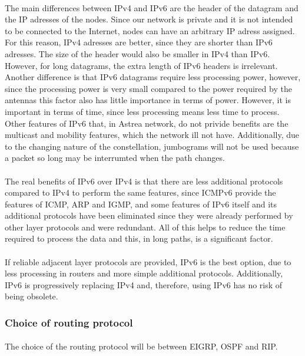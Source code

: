 \paragraph{}The main differences between IPv4 and IPv6 are the header of the datagram and the IP adresses of the nodes. Since our  network is private and it is not intended to be connected to the Internet, nodes can have an arbitrary IP adress assigned. For this reason, IPv4 adresses are better, since they are shorter than IPv6 adresses. The size of the header would also be smaller in IPv4 than IPv6. However, for long datagrams, the extra length of IPv6 headers is irrelevant. Another difference is that IPv6 datagrams require less processing power, however, since the processing power is very small compared to the power required by the antennas this factor also has little importance in terms of power. However, it is important in terms of time, since less processing means less time to process. Other features of IPv6 that, in Astrea network, do not privide benefits are the multicast and mobility features, which the network ill not have. Additionally, due to the changing nature of the constellation, jumbograms will not be used because a packet so long may be interrumted when the path changes.
\paragraph{}The real benefits of IPv6 over IPv4 is that there are less additional protocols compared to IPv4 to perform the same features, since ICMPv6 provide the features of ICMP, ARP and IGMP, and some features of IPv6 itself and its additional protocols have been eliminated since they were already performed by other layer protocols and were redundant. All of this helps to reduce the time required to process the data and this, in long paths, is a significant factor.
\paragraph{}If reliable adjacent layer protocols are provided, IPv6 is the best option, due to less processing in routers and more simple additional protocols. Additionally, IPv6 is progressively replacing IPv4 and, therefore, using IPv6 has no risk of being obsolete.

\subsubsection{Choice of routing protocol}
\paragraph{}The choice of the routing protocol will be between EIGRP, OSPF and RIP.
